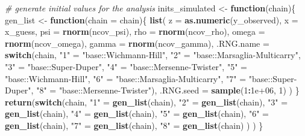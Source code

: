\documentclass[
]{article}
\newenvironment{Shaded}{\begin{snugshade}}{\end{snugshade}}
\newcommand{\CommentTok}[1]{\textcolor[rgb]{0.56,0.35,0.01}{\textit{#1}}}
\newcommand{\ControlFlowTok}[1]{\textcolor[rgb]{0.13,0.29,0.53}{\textbf{#1}}}
\newcommand{\DataTypeTok}[1]{\textcolor[rgb]{0.13,0.29,0.53}{#1}}
\newcommand{\DecValTok}[1]{\textcolor[rgb]{0.00,0.00,0.81}{#1}}
\newcommand{\FloatTok}[1]{\textcolor[rgb]{0.00,0.00,0.81}{#1}}
\newcommand{\KeywordTok}[1]{\textcolor[rgb]{0.13,0.29,0.53}{\textbf{#1}}}
\newcommand{\NormalTok}[1]{#1}
\newcommand{\OperatorTok}[1]{\textcolor[rgb]{0.81,0.36,0.00}{\textbf{#1}}}
\newcommand{\StringTok}[1]{\textcolor[rgb]{0.31,0.60,0.02}{#1}}
\begin{document}
\begin{Shaded}
\begin{Highlighting}[]
\CommentTok{# generate initial values for the analysis}
\NormalTok{inits_simulated <-}\StringTok{ }\ControlFlowTok{function}\NormalTok{(chain)\{}
\NormalTok{  gen_list <-}\StringTok{ }\ControlFlowTok{function}\NormalTok{(}\DataTypeTok{chain =}\NormalTok{ chain)\{}
    \KeywordTok{list}\NormalTok{( }
      \DataTypeTok{z =} \KeywordTok{as.numeric}\NormalTok{(y_observed),}
      \DataTypeTok{x =}\NormalTok{ x_guess,}
      \DataTypeTok{psi =} \KeywordTok{rnorm}\NormalTok{(ncov_psi),}
      \DataTypeTok{rho =} \KeywordTok{rnorm}\NormalTok{(ncov_rho),}
      \DataTypeTok{omega =} \KeywordTok{rnorm}\NormalTok{(ncov_omega),}
      \DataTypeTok{gamma =} \KeywordTok{rnorm}\NormalTok{(ncov_gamma),}
      \DataTypeTok{.RNG.name =} \ControlFlowTok{switch}\NormalTok{(chain,}
                         \StringTok{"1"}\NormalTok{ =}\StringTok{ "base::Wichmann-Hill"}\NormalTok{,}
                         \StringTok{"2"}\NormalTok{ =}\StringTok{ "base::Marsaglia-Multicarry"}\NormalTok{,}
                         \StringTok{"3"}\NormalTok{ =}\StringTok{ "base::Super-Duper"}\NormalTok{,}
                         \StringTok{"4"}\NormalTok{ =}\StringTok{ "base::Mersenne-Twister"}\NormalTok{,}
                         \StringTok{"5"}\NormalTok{ =}\StringTok{ "base::Wichmann-Hill"}\NormalTok{,}
                         \StringTok{"6"}\NormalTok{ =}\StringTok{ "base::Marsaglia-Multicarry"}\NormalTok{,}
                         \StringTok{"7"}\NormalTok{ =}\StringTok{ "base::Super-Duper"}\NormalTok{,}
                         \StringTok{"8"}\NormalTok{ =}\StringTok{ "base::Mersenne-Twister"}\NormalTok{),}
      \DataTypeTok{.RNG.seed =} \KeywordTok{sample}\NormalTok{(}\DecValTok{1}\OperatorTok{:}\FloatTok{1e+06}\NormalTok{, }\DecValTok{1}\NormalTok{)}
\NormalTok{    )}
\NormalTok{  \}}
  \KeywordTok{return}\NormalTok{(}\ControlFlowTok{switch}\NormalTok{(chain,           }
                \StringTok{"1"}\NormalTok{ =}\StringTok{ }\KeywordTok{gen_list}\NormalTok{(chain),}
                \StringTok{"2"}\NormalTok{ =}\StringTok{ }\KeywordTok{gen_list}\NormalTok{(chain),}
                \StringTok{"3"}\NormalTok{ =}\StringTok{ }\KeywordTok{gen_list}\NormalTok{(chain),}
                \StringTok{"4"}\NormalTok{ =}\StringTok{ }\KeywordTok{gen_list}\NormalTok{(chain),}
                \StringTok{"5"}\NormalTok{ =}\StringTok{ }\KeywordTok{gen_list}\NormalTok{(chain),}
                \StringTok{"6"}\NormalTok{ =}\StringTok{ }\KeywordTok{gen_list}\NormalTok{(chain),}
                \StringTok{"7"}\NormalTok{ =}\StringTok{ }\KeywordTok{gen_list}\NormalTok{(chain),}
                \StringTok{"8"}\NormalTok{ =}\StringTok{ }\KeywordTok{gen_list}\NormalTok{(chain)}
\NormalTok{  )}
\NormalTok{  )}
\NormalTok{\}}


\end{Highlighting}
\end{Shaded}
\end{document}

